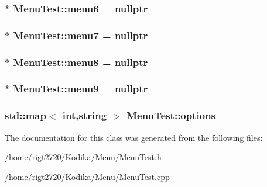 \hypertarget{classMenuTest_a0f507b48519d19324b23abdeb772d401}{
\subsubsection[{menu6}]{$\ast$ Menu\-Test\-::menu6 = nullptr\hspace{0.3cm}{\ttfamily [private]}}}\label{classMenuTest_a0f507b48519d19324b23abdeb772d401}
\hypertarget{classMenuTest_a390ce6025e9e31885105b625fcd099d7}{
\subsubsection[{menu7}]{$\ast$ Menu\-Test\-::menu7 = nullptr\hspace{0.3cm}{\ttfamily [private]}}}\label{classMenuTest_a390ce6025e9e31885105b625fcd099d7}
\hypertarget{classMenuTest_aa86ecdd3de31afd09a942032d48139d1}{
\subsubsection[{menu8}]{$\ast$ Menu\-Test\-::menu8 = nullptr\hspace{0.3cm}{\ttfamily [private]}}}\label{classMenuTest_aa86ecdd3de31afd09a942032d48139d1}
\hypertarget{classMenuTest_a0ffac80371c29a88860328242666307f}{
\subsubsection[{menu9}]{$\ast$ Menu\-Test\-::menu9 = nullptr\hspace{0.3cm}{\ttfamily [private]}}}\label{classMenuTest_a0ffac80371c29a88860328242666307f}
\hypertarget{classMenuTest_a315fe94d0bb3bf2d550d5bd326ac99a0}{
\subsubsection[{options}]{\setlength{\rightskip}{0pt plus 5cm}std\-::map$<$ int,string $>$ Menu\-Test\-::options\hspace{0.3cm}{\ttfamily [private]}}}\label{classMenuTest_a315fe94d0bb3bf2d550d5bd326ac99a0}


The documentation for this class was generated from the following files\-:\begin{DoxyCompactItemize}
\item 
/home/rigt2720/\-Kodika/\-Menu/\hyperlink{MenuTest_8h}{Menu\-Test.\-h}\item 
/home/rigt2720/\-Kodika/\-Menu/\hyperlink{MenuTest_8cpp}{Menu\-Test.\-cpp}\end{DoxyCompactItemize}
